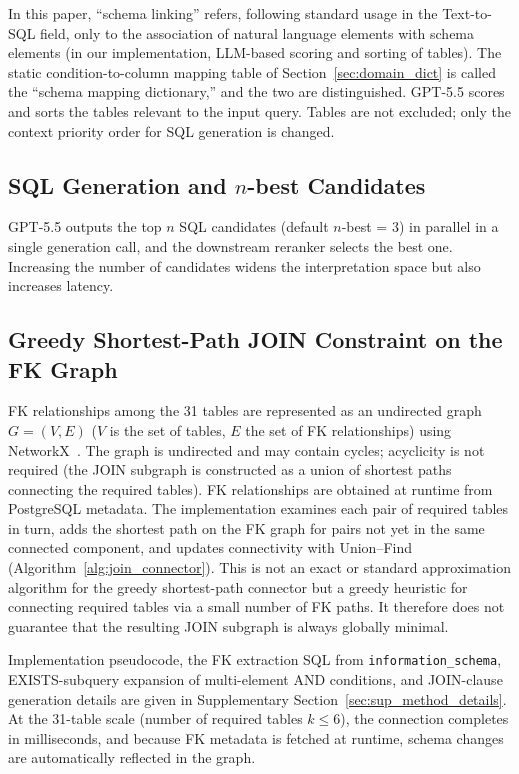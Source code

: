 In this paper, ``schema linking'' refers, following standard usage in the Text-to-SQL field, only to the association of natural language elements with schema elements (in our implementation, LLM-based scoring and sorting of tables). The static condition-to-column mapping table of Section~\ref{sec:domain_dict} is called the ``schema mapping dictionary,'' and the two are distinguished. GPT-5.5 scores and sorts the tables relevant to the input query. Tables are not excluded; only the context priority order for SQL generation is changed.

\subsection{SQL Generation and $n$-best Candidates}
\label{sec:nbest}

GPT-5.5 outputs the top $n$ SQL candidates (default $n$-best = 3) in parallel in a single generation call, and the downstream reranker selects the best one. Increasing the number of candidates widens the interpretation space but also increases latency.
\subsection{Greedy Shortest-Path JOIN Constraint on the FK Graph}
\label{sec:schema_graph}

FK relationships among the 31 tables are represented as an undirected graph $G=(V,E)$ ($V$ is the set of tables, $E$ the set of FK relationships) using NetworkX~\cite{networkx2008}. The graph is undirected and may contain cycles; acyclicity is not required (the JOIN subgraph is constructed as a union of shortest paths connecting the required tables). FK relationships are obtained at runtime from PostgreSQL metadata. The implementation examines each pair of required tables in turn, adds the shortest path on the FK graph for pairs not yet in the same connected component, and updates connectivity with Union--Find (Algorithm~\ref{alg:join_connector}). This is not an exact or standard approximation algorithm for the greedy shortest-path connector but a greedy heuristic for connecting required tables via a small number of FK paths. It therefore does not guarantee that the resulting JOIN subgraph is always globally minimal.

Implementation pseudocode, the FK extraction SQL from \texttt{information\_schema}, EXISTS-subquery expansion of multi-element AND conditions, and JOIN-clause generation details are given in Supplementary Section~\ref{sec:sup_method_details}. At the 31-table scale (number of required tables $k \leq 6$), the connection completes in milliseconds, and because FK metadata is fetched at runtime, schema changes are automatically reflected in the graph.

